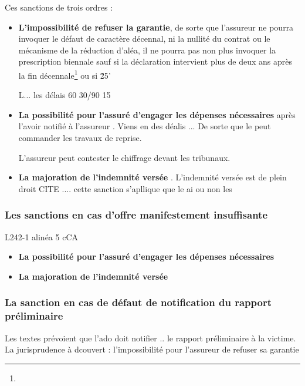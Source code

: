 			Ces sanctions de trois ordres :
			\begin{itemize}
				\item \textbf{L'impossibilité de refuser la garantie}, de sorte que l'assureur ne pourra invoquer le défaut de caractère décennal, ni la nullité du contrat  ou le mécanisme de la réduction d'aléa, il ne pourra pas non plus invoquer la prescription biennale sauf si la déclaration intervient plus de deux ans après la fin décennale\footnote{} ou si \~25'

				L... les délais 60 30/90 15

				\item \textbf{La possibilité pour l'assuré d'engager les dépenses nécessaires} après l'avoir notifié à l'assureur . Viens en des déalis ... De sorte que le \Mo peut commander les travaux de reprise.

				L'assureur peut contester le chiffrage devant les tribunaux.

				\item \textbf{La majoration de l'indemnité versée} . L'indemnité versée est de plein droit CITE .... cette sanction s'apllique que le \Mo ai ou non les
			\end{itemize}

		\subsubsection{Les sanctions en cas d'offre manifestement insuffisante}

			L242-1 alinéa 5 cCA

			\begin{itemize}
				\item \textbf{La possibilité pour l'assuré d'engager les dépenses nécessaires}
				\item \textbf{La majoration de l'indemnité versée}
			\end{itemize}

		\subsubsection{La sanction en cas de défaut de notification du rapport préliminaire}

			Les textes prévoient que l'ado doit notifier .. le rapport préliminaire à la victime. La jurisprudence à dcouvert : l'impossibilité pour l'assureur de refuser sa garantie

